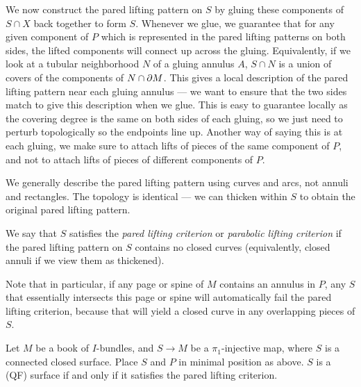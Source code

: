 We now construct the pared lifting pattern on $S$ by gluing these components of
$S \cap X$ back together to form $S$. Whenever we glue, we guarantee that for
any given component of $P$ which is represented in the pared lifting patterns
on both sides, the lifted components will connect up across the gluing.
Equivalently, if we look at a tubular neighborhood $N$ of a gluing annulus $A$,
$S \cap N$ is a union of covers of the components of $N \cap \partial M$. This gives
a local description of the pared lifting pattern near each gluing annulus ---
we want to ensure that the two sides match to give this description when we
glue.  This is easy to guarantee locally as the covering degree is the same on
both sides of each gluing, so we just need to perturb topologically so the
endpoints line up.  Another way of saying this is at each gluing, we make sure
to attach lifts of pieces of the same component of $P$, and not to attach lifts
of pieces of different components of $P$.

We generally describe the pared lifting pattern using curves and arcs, not
annuli and rectangles. The topology is identical --- we can thicken within $S$
to obtain the original pared lifting pattern.

\begin{defn}

We say that $S$ satisfies the \emph{pared lifting criterion} or \emph{parabolic
lifting criterion} if the pared lifting pattern on $S$ contains no closed
curves (equivalently, closed annuli if we view them as thickened).

\end{defn}

Note that in particular, if any page or spine of $M$ contains an annulus in
$P$, any $S$ that essentially intersects this page or spine will automatically
fail the pared lifting criterion, because that will yield a closed curve in any
overlapping pieces of $S$.

\begin{theorem}\label{T:lift}

Let $M$ be a book of $I$-bundles, and $S \to M$ be a $\pi_1$-injective map,
where $S$ is a connected closed surface.  Place $S$ and $P$ in minimal position
as above.  $S$ is a (QF) surface if and only if it satisfies the pared lifting
criterion.

\end{theorem}

